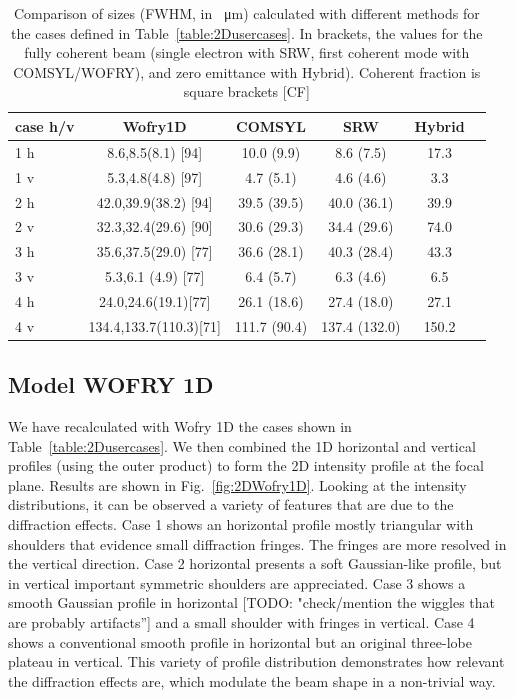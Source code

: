 \documentclass{iucr}              %
\newcommand{\todo}[1]{{\color{red}[TODO: "#1'']}}
\newcommand{\inblue}[1]{{\color{blue}#1}}
\begin{document}
\begin{table}[]
    \label{table:comparison}
    \caption{Comparison of sizes (FWHM, in \SI{}{\micro\meter}) calculated with different methods for the cases defined in Table~\ref{table:2Dusercases}.
    In brackets, the values for the fully coherent beam (single electron with SRW, first coherent mode with COMSYL/WOFRY), and zero emittance with Hybrid).
    Coherent fraction is square brackets \inblue{[CF]}}
    \centering
    \begin{tabular}{p{}|c|c|c|c|c|}
         case h/v &
         Wofry1D&
         COMSYL&
         SRW&
         Hybrid \\
         \hline
1 h  & 8.6,8.5(8.1) \inblue{[94]}  & 10.0 (9.9)  & 8.6 (7.5)   & 17.3 \\
1 v  & 5.3,4.8(4.8) \inblue{[97]}   & 4.7 (5.1)   & 4.6 (4.6)   & 3.3 \\
\hline
2 h  & 42.0,39.9(38.2) \inblue{[94]} & 39.5 (39.5) & 40.0 (36.1)  & 39.9 \\
2 v  & 32.3,32.4(29.6) \inblue{[90]} & 30.6 (29.3) & 34.4 (29.6)  & 74.0 \\
\hline
3 h  & 35.6,37.5(29.0) \inblue{[77]} & 36.6 (28.1) & 40.3 (28.4)  & 43.3 \\
3 v  & 5.3,6.1 (4.9)  \inblue{[77]} & 6.4 (5.7) & 6.3 (4.6)   & 6.5 \\
\hline
4 h  & 24.0,24.6(19.1)\inblue{[77]}  & 26.1 (18.6) & 27.4 (18.0)  & 27.1 \\
4 v  & 134.4,133.7(110.3)\inblue{[71]}& 111.7 (90.4) & 137.4 (132.0) & 150.2 \\
    \end{tabular}
\end{table}


\subsection{Model WOFRY 1D}
We have recalculated with Wofry 1D the cases shown in Table~\ref{table:2Dusercases}. We then combined the 1D horizontal and vertical profiles (using the outer product) to form the 2D intensity profile at the focal plane. Results are shown in Fig.~\ref{fig:2DWofry1D}. Looking at the intensity distributions, it can be observed a variety of features that are due to the diffraction effects. Case 1 shows an horizontal profile mostly triangular with shoulders that evidence small diffraction fringes. The fringes are more resolved in the vertical direction. Case 2 horizontal presents a soft Gaussian-like profile, but in vertical important symmetric shoulders are appreciated. Case 3 shows a smooth Gaussian profile in horizontal \todo{check/mention the wiggles that are probably artifacts} and a small shoulder with fringes in vertical. Case 4 shows a conventional smooth profile in horizontal but an original three-lobe plateau in vertical. This variety of profile distribution demonstrates how relevant the diffraction effects are, which modulate the beam shape in a non-trivial way.  
\end{document}
